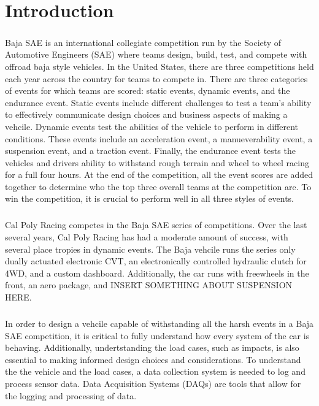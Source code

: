 \chapter{Introduction}

\paragraph{}
Baja SAE is an international collegiate competition run by the Society of Automotive Engineers (SAE) where teams design, build, test, and compete with offroad baja style vehicles.
In the United States, there are three competitions held each year across the country for teams to compete in. 
There are three categories of events for which teams are scored: static events, dynamic events, and the endurance event.  
Static events include different challenges to test a team's ability to effectively communicate design choices and business aspects of making a vehcile.  
Dynamic events test the abilities of the vehicle to perform in different conditions.  
These events include an acceleration event, a manueverability event, a suspension event, and a traction event.  
Finally, the endurance event tests the vehicles and drivers ability to withstand rough terrain and wheel to wheel racing for a full four hours.
At the end of the competition, all the event scores are added together to determine who the top three overall teams at the competition are.
To win the competition, it is crucial to perform well in all three styles of events.

\paragraph{}
Cal Poly Racing competes in the Baja SAE series of competitions.
Over the last several years, Cal Poly Racing has had a moderate amount of success, with several place tropies in dynamic events.
The Baja vehcile runs the series only dually actuated electronic CVT, an electronically controlled hydraulic clutch for 4WD, and a custom dashboard.
Additionally, the car runs with freewheels in the front, an aero package, and INSERT SOMETHING ABOUT SUSPENSION HERE.

\paragraph{}
In order to design a vehcile capable of withstanding all the harsh events in a Baja SAE competition, it is critical to fully understand how every system of the car is behaving.
Additionally, undertstanding the load cases, such as impacts, is also essential to making informed design choices and considerations.
To understand the the vehicle and the load cases, a data collection system is needed to log and process sensor data.
Data Acquisition Systems (DAQs) are tools that allow for the logging and processing of data.

\paragraph{}

